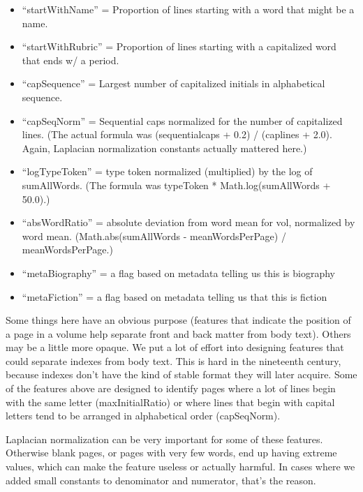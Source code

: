 \documentclass[paper=a4, fontsize=12pt]{scrartcl}
\numberwithin{equation}{section}		%
\numberwithin{figure}{section}			%
\numberwithin{table}{section}				%
\begin{document}
\begin{itemize}
\item  ``startWithName'' = Proportion of lines starting with a word that might be a name.
\item  ``startWithRubric'' = Proportion of lines starting with a capitalized word that ends w/ a period.
\item  ``capSequence'' = Largest number of capitalized initials in alphabetical sequence. 
\item  ``capSeqNorm'' = Sequential caps normalized for the number of capitalized lines. (The actual formula was (sequentialcaps + 0.2) / (caplines + 2.0). Again, Laplacian normalization constants actually mattered here.)
\item  ``logTypeToken'' = type token normalized (multiplied) by the log of sumAllWords. (The formula was typeToken * Math.log(sumAllWords + 50.0).)
\item  ``absWordRatio'' = absolute deviation from word mean for vol, normalized by word mean. (Math.abs(sumAllWords - meanWordsPerPage) / meanWordsPerPage.)
\item  ``metaBiography'' = a flag based on metadata telling us this is biography
\item  ``metaFiction'' = a flag based on metadata telling us that this is fiction
\end{itemize}

Some things here have an obvious purpose (features that indicate the position of a page in a volume help separate front and back matter from body text). Others may be a little more opaque. We put a lot of effort into designing features that could separate indexes from body text. This is hard in the nineteenth century, because indexes don't have the kind of stable format they will later acquire. Some of the features above are designed to identify pages where a lot of lines begin with the same letter (maxInitialRatio) or where lines that begin with capital letters tend to be arranged in alphabetical order (capSeqNorm).

Laplacian normalization can be very important for some of these features. Otherwise blank pages, or pages with very few words, end up having extreme values, which can make the feature useless or actually harmful. In cases where we added small constants to denominator and numerator, that's the reason.
\end{document}
